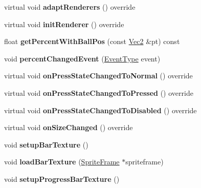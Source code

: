 \begin{DoxyCompactItemize}
virtual void {\bfseries adapt\+Renderers} () override
\item 
\mbox{\label{classui_1_1Slider_ad76d3945f07e844d960949499fc62081}} 
virtual void {\bfseries init\+Renderer} () override
\item 
\mbox{\label{classui_1_1Slider_a814b24eb499409d844cbaa06085fb00d}} 
float {\bfseries get\+Percent\+With\+Ball\+Pos} (const \hyperlink{classVec2}{Vec2} \&pt) const
\item 
\mbox{\label{classui_1_1Slider_a7ce77231e9954cce68898076f62ca777}} 
void {\bfseries percent\+Changed\+Event} (\hyperlink{classui_1_1Slider_aaaaec31aa46f491595d338978033c267}{Event\+Type} event)
\item 
\mbox{\label{classui_1_1Slider_a072674a6724fcc9bb27eb723186f5642}} 
virtual void {\bfseries on\+Press\+State\+Changed\+To\+Normal} () override
\item 
\mbox{\label{classui_1_1Slider_acbe2e15a649d5971ba49a66bbc66aaae}} 
virtual void {\bfseries on\+Press\+State\+Changed\+To\+Pressed} () override
\item 
\mbox{\label{classui_1_1Slider_a26947b6fe1698f09d0690b26ee6a020c}} 
virtual void {\bfseries on\+Press\+State\+Changed\+To\+Disabled} () override
\item 
\mbox{\label{classui_1_1Slider_a6c8f9f1697c607e2b02d485e45ad58ba}} 
virtual void {\bfseries on\+Size\+Changed} () override
\item 
\mbox{\label{classui_1_1Slider_a4a259c44d05bb65a8eea19479ab75b8e}} 
void {\bfseries setup\+Bar\+Texture} ()
\item 
\mbox{\label{classui_1_1Slider_a0a6a3ed52773b35357e37d64f10d22f4}} 
void {\bfseries load\+Bar\+Texture} (\hyperlink{classSpriteFrame}{Sprite\+Frame} $\ast$spriteframe)
\item 
\mbox{\label{classui_1_1Slider_aac42d247a5b222b609753f473eea3f3c}} 
void {\bfseries setup\+Progress\+Bar\+Texture} ()

\end{DoxyCompactItemize}
